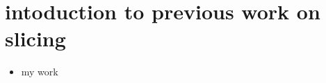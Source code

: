 \section{intoduction to previous work on
slicing}\label{intoduction-to-previous-work-on-slicing}

\begin{itemize}
\tightlist
\item
  my work
\end{itemize}

